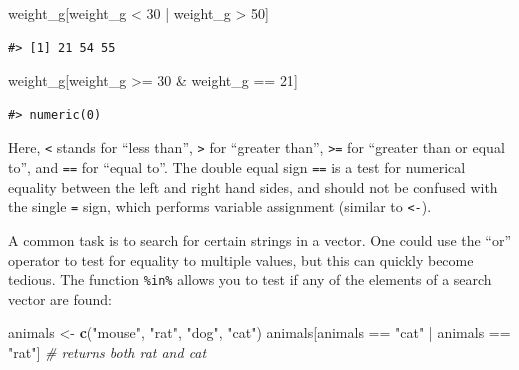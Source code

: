 \documentclass[]{book}
\newenvironment{Shaded}{\begin{snugshade}}{\end{snugshade}}
\newcommand{\KeywordTok}[1]{\textcolor[rgb]{0.13,0.29,0.53}{\textbf{{#1}}}}
\newcommand{\DecValTok}[1]{\textcolor[rgb]{0.00,0.00,0.81}{{#1}}}
\newcommand{\StringTok}[1]{\textcolor[rgb]{0.31,0.60,0.02}{{#1}}}
\newcommand{\CommentTok}[1]{\textcolor[rgb]{0.56,0.35,0.01}{\textit{{#1}}}}
\newcommand{\NormalTok}[1]{{#1}}
\theoremstyle{definition}
\theoremstyle{definition}
\theoremstyle{remark}
\begin{document}
\begin{Shaded}
\begin{Highlighting}[]
\NormalTok{weight_g[weight_g <}\StringTok{ }\DecValTok{30} \NormalTok{|}\StringTok{ }\NormalTok{weight_g >}\StringTok{ }\DecValTok{50}\NormalTok{]}
\end{Highlighting}
\end{Shaded}

\begin{verbatim}
#> [1] 21 54 55
\end{verbatim}

\begin{Shaded}
\begin{Highlighting}[]
\NormalTok{weight_g[weight_g >=}\StringTok{ }\DecValTok{30} \NormalTok{&}\StringTok{ }\NormalTok{weight_g ==}\StringTok{ }\DecValTok{21}\NormalTok{]}
\end{Highlighting}
\end{Shaded}

\begin{verbatim}
#> numeric(0)
\end{verbatim}

Here, \texttt{\textless{}} stands for ``less than'',
\texttt{\textgreater{}} for ``greater than'', \texttt{\textgreater{}=}
for ``greater than or equal to'', and \texttt{==} for ``equal to''. The
double equal sign \texttt{==} is a test for numerical equality between
the left and right hand sides, and should not be confused with the
single \texttt{=} sign, which performs variable assignment (similar to
\texttt{\textless{}-}).

A common task is to search for certain strings in a vector. One could
use the ``or'' operator \texttt{\textbar{}} to test for equality to
multiple values, but this can quickly become tedious. The function
\texttt{\%in\%} allows you to test if any of the elements of a search
vector are found:

\begin{Shaded}
\begin{Highlighting}[]
\NormalTok{animals <-}\StringTok{ }\KeywordTok{c}\NormalTok{(}\StringTok{"mouse"}\NormalTok{, }\StringTok{"rat"}\NormalTok{, }\StringTok{"dog"}\NormalTok{, }\StringTok{"cat"}\NormalTok{)}
\NormalTok{animals[animals ==}\StringTok{ "cat"} \NormalTok{|}\StringTok{ }\NormalTok{animals ==}\StringTok{ "rat"}\NormalTok{] }\CommentTok{# returns both rat and cat}
\end{Highlighting}
\end{Shaded}
\end{document}
